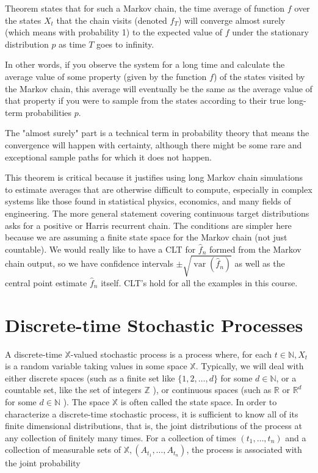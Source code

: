 \documentclass[10pt]{article}
\begin{document}
Theorem states that for such a Markov chain, the time average of function \( f \) over the states \( X_t \) that the chain visits (denoted \( \hat{f}_T \)) will converge almost surely (which means with probability 1) to the expected value of \( f \) under the stationary distribution \( p \) as time \( T \) goes to infinity.

In other words, if you observe the system for a long time and calculate the average value of some property (given by the function \( f \)) of the states visited by the Markov chain, this average will eventually be the same as the average value of that property if you were to sample from the states according to their true long-term probabilities \( p \).

The "almost surely" part is a technical term in probability theory that means the convergence will happen with certainty, although there might be some rare and exceptional sample paths for which it does not happen.

This theorem is critical because it justifies using long Markov chain simulations to estimate averages that are otherwise difficult to compute, especially in complex systems like those found in statistical physics, economics, and many fields of engineering.
\newline
The more general statement covering continuous target distributions asks for a positive or Harris recurrent chain. The conditions are simpler here because we are assuming a finite state space for the Markov chain (not just countable).
We would really like to have a CLT for $\hat{f}_n$ formed from the Markov chain output, so we have confidence intervals $\pm \sqrt{\operatorname{var}\left(\hat{f}_n\right)}$ as well as the central point estimate $\hat{f}_n$ itself. CLT's hold for all the examples in this course. 


\section{Discrete-time Stochastic Processes}
A discrete-time $\mathbb{X}$-valued stochastic process is a process where, for each $t \in \mathbb{N}, X_{t}$ is a random variable taking values in some space $\mathbb{X}$. Typically, we will deal with either discrete spaces (such as a finite set like $\{1,2, \ldots, d\}$ for some $d \in \mathbb{N}$, or a countable set, like the set of integers $\mathbb{Z}$ ), or continuous spaces (such as $\mathbb{R}$ or $\mathbb{R}^{d}$ for some $d \in \mathbb{N}$ ). The space $\mathbb{X}$ is often called the state space. In order to characterize a discrete-time stochastic process, it is sufficient to know all of its finite dimensional distributions, that is, the joint distributions of the process at any collection of finitely many times. For a collection of times $\left(t_{1}, \ldots, t_{n}\right)$ and a collection of measurable sets of $\mathbb{X},\left(A_{t_{1}}, \ldots, A_{t_{n}}\right)$, the process is associated with the joint probability
\end{document}
